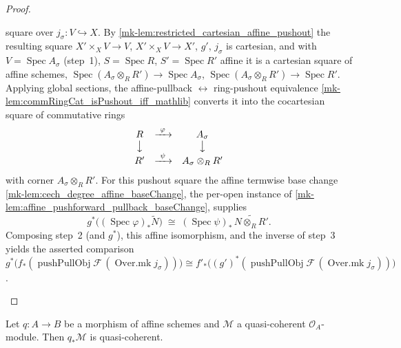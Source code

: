 \begin{proof}
\begin{enumerate}
      square over \(j_\sigma : V \hookrightarrow X\). By
      \ref{mk-lem:restricted_cartesian_affine_pushout} the resulting square
      \(X' \times_X V \to V\), \(X' \times_X V \to X'\), \(g'\), \(j_\sigma\) is cartesian, and
      with \(V = \operatorname{Spec} A_\sigma\) (step~1), \(S = \operatorname{Spec} R\),
      \(S' = \operatorname{Spec} R'\) affine it is a cartesian square of affine schemes,
      \(\operatorname{Spec}(A_\sigma \otimes_R R') \to \operatorname{Spec} A_\sigma\),
      \(\operatorname{Spec}(A_\sigma \otimes_R R') \to \operatorname{Spec} R'\). Applying global
      sections, the affine-pullback \(\leftrightarrow\) ring-pushout equivalence
      \ref{mk-lem:commRingCat_isPushout_iff_mathlib} converts it into the cocartesian square of
      commutative rings
      \[
        \begin{array}{ccc}
          R & \xrightarrow{\ \varphi\ } & A_\sigma\\
          \big\downarrow & & \big\downarrow\\
          R' & \xrightarrow{\ \psi\ } & A_\sigma \otimes_R R'
        \end{array}
      \]
      with corner \(A_\sigma \otimes_R R'\). For this pushout square the affine termwise base
      change \ref{mk-lem:cech_degree_affine_baseChange}, the per-open instance of
      \ref{mk-lem:affine_pushforward_pullback_baseChange}, supplies
      \[
        g^*\bigl((\operatorname{Spec}\varphi)_*\widetilde{N}\bigr)
          \;\cong\; (\operatorname{Spec}\psi)_*\,\widetilde{N \otimes_R R'}.
      \]
      Composing step~2 (and \(g^*\)), this affine isomorphism, and the inverse of step~3 yields
      the asserted comparison
      \(g^*\bigl(f_*(\operatorname{pushPullObj}\mathcal{F}\,(\operatorname{Over.mk}
      j_\sigma))\bigr) \cong f'_*\bigl((g')^*(\operatorname{pushPullObj}\mathcal{F}\,
      (\operatorname{Over.mk} j_\sigma))\bigr)\).
  \end{enumerate}
\end{proof}

\begin{lemma}\label{mk-lem:isQuasicoherent_pushforward_of_isAffine}
  \leanok

  Let \(q : A \to B\) be a morphism of affine schemes and \(\mathcal{M}\) a quasi-coherent
  \(\mathcal{O}_A\)-module. Then \(q_*\mathcal{M}\) is quasi-coherent.
\end{lemma}

